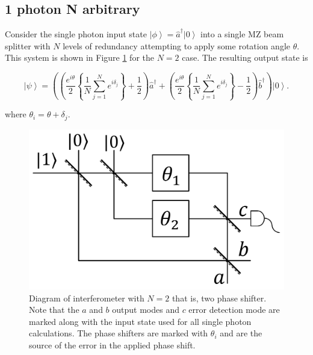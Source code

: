 \documentclass[aps,pra,twocolumn,superscriptaddress,numerical]{revtex4-1}
\begin{document}
	
\subsection{1 photon N arbitrary \label{1 photon N arbitrary}}
	
		Consider the single photon input state $\left|\phi\right\rangle = \hat{a}^{\dagger}\left|0\right\rangle $ into a single MZ beam splitter with $N$ levels of redundancy attempting to apply some rotation angle $\theta$. This system is shown in Figure \ref{fig:MZ_setup} for the $N=2$ case. The resulting output state is
		
		\begin{widetext}
			\begin{equation}
				\left|\psi\right\rangle =\left(\left(\frac{e^{i\theta}}{2}\left\{ 	\frac{1}{N}\sum_{j=1}^{N}e^{i\delta_{j}}\right\} +\frac{1}{2}\right)\hat{a}^{\dagger}+\left(\frac{e^{i\theta}}{2}\left\{ \frac{1}{N}\sum_{j=1}^{N}e^{i\delta_{j}}\right\} -\frac{1}{2}\right)\hat{b}^{\dagger}\right)\left|0\right\rangle .\label{eq:1ParbN}
			\end{equation}
		\end{widetext}
	
		where $\theta_{i}=\theta+\delta_{j}$.
		\begin{figure}
			\includegraphics[width=\columnwidth]{2N1P.png}
			\caption{\label{fig:MZ_setup}Diagram of interferometer with $N=2$ that is, two phase shifter. Note that the $a$ and $b$ output modes and $c$ error detection mode are marked along with the input state used for all single photon calculations. The phase shifters are marked with $\theta_{i}$ and are the source of the error in the applied phase shift.}
		\end{figure}
		
\end{document}
